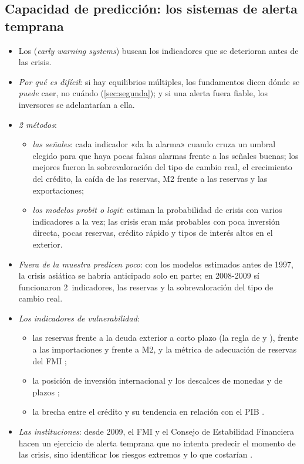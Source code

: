 \documentclass[11pt]{article}
\begin{document}
\subsection{Capacidad de predicción: los sistemas de alerta temprana}\label{sec:prediccion}

\begin{itemize}
\item Los  (\emph{early warning systems}) buscan los indicadores que se deterioran antes de las crisis.
\item \emph{Por qué es difícil}: si hay equilibrios múltiples, los fundamentos dicen dónde se \emph{puede} caer, no cuándo (\ref{sec:segunda}); y si una alerta fuera fiable, los inversores se adelantarían a ella.
\item \emph{2 métodos}:
  \begin{itemize}
  \item \emph{las señales}: cada indicador «da la alarma» cuando cruza un umbral elegido para que haya pocas falsas alarmas frente a las señales buenas; los mejores fueron la sobrevaloración del tipo de cambio real, el crecimiento del crédito, la caída de las reservas, M2 frente a las reservas y las exportaciones\nocite{KLR1998Leading};
  \item \emph{los modelos probit o logit}: estiman la probabilidad de crisis con varios indicadores a la vez; las crisis eran más probables con poca inversión directa, pocas reservas, crédito rápido y tipos de interés altos en el exterior\nocite{FrankelRose1996Crashes}.
  \end{itemize}
\item \emph{Fuera de la muestra predicen poco}: con los modelos estimados antes de 1997, la crisis asiática se habría anticipado solo en parte\nocite{BergPattillo1999}; en 2008-2009 sí funcionaron 2~indicadores, las reservas y la sobrevaloración del tipo de cambio real\nocite{FrankelSaravelos2012Leading}.
\item \emph{Los indicadores de vulnerabilidad}:
  \begin{itemize}
  \item las reservas frente a la deuda exterior a corto plazo (la regla de  y ), frente a las importaciones y frente a M2, y la métrica de adecuación de reservas del FMI ;
  \item la posición de inversión internacional y los descalces de monedas y de plazos ;
  \item la brecha entre el crédito y su tendencia en relación con el PIB .
  \end{itemize}
\item \emph{Las instituciones}: desde 2009, el FMI y el Consejo de Estabilidad Financiera hacen un ejercicio de alerta temprana que no intenta predecir el momento de las crisis, sino identificar los riesgos extremos y lo que costarían\nocite{FMI2010EWE}  .
\end{itemize}
\end{document}
